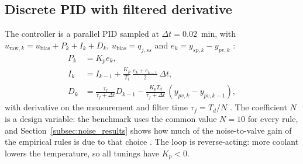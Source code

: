 \subsection{Discrete PID with filtered derivative}
The controller is a parallel PID sampled at $\Delta t = 0.02$~min, with $u_{\text{raw},k} = u_{\text{bias}} + P_k + I_k + D_k$, $u_{\text{bias}} = q_{j,ss}$ and $e_k = y_{sp,k} - y_{pv,k}$ \cite{astrom2006pid, seborg2010process}:
\begin{align}
    P_k &= K_p e_k, \label{eq:proportional_term} \\
    I_k &= I_{k-1} + \frac{K_p}{T_i}\,\frac{e_k + e_{k-1}}{2}\,\Delta t, \label{eq:integral_trapezoidal} \\
    D_k &= \frac{\tau_f}{\tau_f + \Delta t} D_{k-1} - \frac{K_p T_d}{\tau_f + \Delta t}\,(y_{pv,k} - y_{pv,k-1}), \label{eq:derivative_filtered}
\end{align}
with derivative on the measurement and filter time $\tau_f = T_d/N$ \cite{astrom1995pid, visioli2006practical}. The coefficient $N$ is a design variable: the benchmark uses the common value $N = 10$ for every rule, and Section~\ref{subsec:noise_results} shows how much of the noise-to-valve gain of the empirical rules is due to that choice \cite{segovia2013noise}. The loop is reverse-acting: more coolant lowers the temperature, so all tunings have $K_p < 0$.

